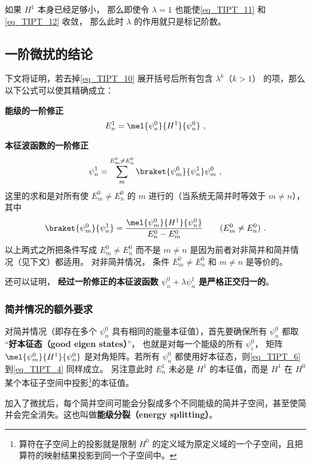 如果 $H^1$ 本身已经足够小， 那么即使令 $\lambda = 1$ 也能使\autoref{eq_TIPT_11} 和\autoref{eq_TIPT_12} 收敛， 那么此时 $\lambda$ 的作用就只是标记阶数。

\subsection{一阶微扰的结论}
下文将证明，若去掉\autoref{eq_TIPT_10} 展开括号后所有包含 $\lambda^k$（$k>1$） 的项，那么以下公式可以使其精确成立：

\textbf{能级的一阶修正}
\begin{equation}\label{eq_TIPT_6}
E_n^1 = \mel{\psi_n^0}{H^1}{\psi_n^0}~,
\end{equation}

\textbf{本征波函数的一阶修正}
\begin{equation}\label{eq_TIPT_5}
\psi_n^1 = \sum_m^{E_m^0 \ne E_n^0} \braket{\psi_m^0}{\psi_n^1} \psi_m^0~,
\end{equation}
这里的求和是对所有使 $E_m^0 \ne E_n^0$ 的 $m$ 进行的（当系统无简并时等效于 $m\ne n$）， 其中
\begin{equation}\label{eq_TIPT_4}
\braket{\psi_m^0}{\psi_n^1} = \frac{\mel{\psi_m^0}{H^1}{\psi_n^0}}{E_n^0 - E_m^0} \qquad (E_m^0 \ne E_n^0)~.
\end{equation}
以上两式之所把条件写成 $E_m^0 \ne E_n^0$ 而不是 $m \ne n$ 是因为前者对非简并和简并情况（见下文）都适用。 对非简并情况， 条件 $E_m^0 \ne E_n^0$ 和 $m \ne n$ 是等价的。

还可以证明， \textbf{经过一阶修正的本征波函数 $\psi_n^0 + \lambda\psi_n^1$ 是严格正交归一的}。

\subsubsection{简并情况的额外要求}
对简并情况（即存在多个 $\psi_n^0$ 具有相同的能量本征值），首先要确保所有 $\psi_n^0$ 都取 “\textbf{好本征态（good eigen states）}”， 也就是对每一个能级的所有 $\psi_i^0$， 矩阵 $\mel{\psi_m^0}{H^1}{\psi_n^0}$ 是对角矩阵。若所有 $\psi_n^0$ 都使用好本征态，则\autoref{eq_TIPT_6} 到\autoref{eq_TIPT_4} 同样成立。 另注意此时 $E_n^1$ 未必是 $H^1$ 的本征值，而是 $H^1$ 在 $H^0$ 某个本征子空间中投影\footnote{算符在子空间上的投影就是限制 $H^0$ 的定义域为原定义域的一个子空间，且把算符的映射结果投影到同一个子空间中。}的本征值。

加入了微扰后，每个简并空间可能会分裂成多个不同能级的简并子空间，甚至使简并会完全消失。这也叫做\textbf{能级分裂（energy splitting）}。

